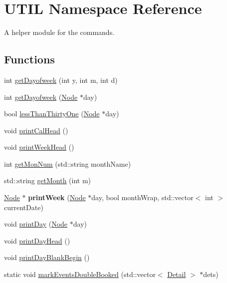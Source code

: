 \hypertarget{namespaceUTIL}{\section{U\-T\-I\-L Namespace Reference}
\label{namespaceUTIL}
}


A helper module for the commands.  


\subsection*{Functions}
\begin{DoxyCompactItemize}
\item 
int \hyperlink{group__UTIL_gaa9c234531d4ed8848e15458f8fcb377c}{get\-Dayofweek} (int y, int m, int d)
\item 
int \hyperlink{group__UTIL_ga7a178c29c06227bb28a5b651b8d57908}{get\-Dayofweek} (\hyperlink{classNode}{Node} $\ast$day)
\item 
bool \hyperlink{group__UTIL_gaefbc24433355f7a87cd9f1a6eeb6393e}{less\-Than\-Thirty\-One} (\hyperlink{classNode}{Node} $\ast$day)
\item 
void \hyperlink{group__UTIL_gae51cb73bab26a8b09786c55a4491eed0}{print\-Cal\-Head} ()
\item 
void \hyperlink{group__UTIL_gac9ec4c5a9961d7932fbd04c40c17d110}{print\-Week\-Head} ()
\item 
int \hyperlink{group__UTIL_ga3ae728ca2e986674b59994f39ce12f04}{get\-Mon\-Num} (std\-::string month\-Name)
\item 
std\-::string \hyperlink{group__UTIL_gaab82a62e4871b62fdf10cec49a8eaa24}{get\-Month} (int m)
\item 
\hypertarget{group__UTIL_gab2f2244a22eff0c715737d8236b5b6ce}{\hyperlink{classNode}{Node} $\ast$ {\bfseries print\-Week} (\hyperlink{classNode}{Node} $\ast$day, bool month\-Wrap, std\-::vector$<$ int $>$ current\-Date)}\label{group__UTIL_gab2f2244a22eff0c715737d8236b5b6ce}

\item 
void \hyperlink{group__UTIL_ga974003737cc9f033ee267c54092af631}{print\-Day} (\hyperlink{classNode}{Node} $\ast$day)
\item 
void \hyperlink{group__UTIL_gaf42511038942fe8acfd713b8e39de1eb}{print\-Day\-Head} ()
\item 
void \hyperlink{group__UTIL_ga63005cc2bbe386d0d6def9216246170b}{print\-Day\-Blank\-Begin} ()
\item 
static void \hyperlink{group__UTIL_ga56218f451bf4a1c2f050eeece129acd7}{mark\-Events\-Double\-Booked} (std\-::vector$<$ \hyperlink{classDetail}{Detail} $>$ $\ast$dets)
\end{DoxyCompactItemize}
